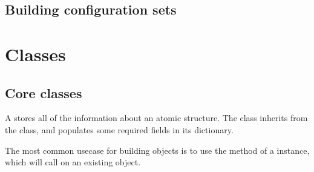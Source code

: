 \documentclass[letterpaper,10pt,english]{sphinxmanual}
\begin{document}
\section{Building configuration sets}
\label{\detokenize{usage:building-configuration-sets}}

\chapter{Classes}
\label{\detokenize{classes:classes}}\label{\detokenize{classes:colabfit-tools}}\label{\detokenize{classes::doc}}

\section{Core classes}
\label{\detokenize{core_classes:core-classes}}\label{\detokenize{core_classes::doc}}\label{\detokenize{configuration:module-colabfit.tools.configuration}}
\sphinxAtStartPar
A {\hyperref[\detokenize{configuration:colabfit.tools.configuration.Configuration}]{}} stores all of the information about an atomic
structure. The {\hyperref[\detokenize{configuration:colabfit.tools.configuration.Configuration}]{}} class inherits from the 
class, and populates some required fields in its  dictionary.

\sphinxAtStartPar
The most common use\sphinxhyphen{}case for building {\hyperref[\detokenize{configuration:colabfit.tools.configuration.Configuration}]{}} objects is to use
the {\hyperref[\detokenize{converters:colabfit.tools.converters.BaseConverter.load}]{}} method of a
 instance, which will call
{\hyperref[\detokenize{configuration:colabfit.tools.configuration.Configuration.from_ase}]{}} on an existing  object.

\begin{sphinxVerbatim}[commandchars=\\\{\}]
   

  

  
\end{sphinxVerbatim}
\end{document}
